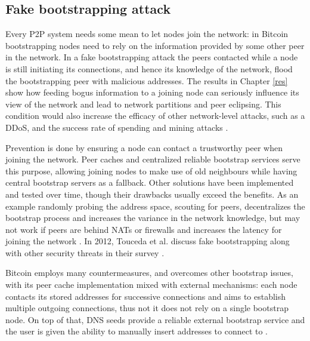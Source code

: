 \documentclass[12pt, letterpaper, twoside]{article}
\begin{document}
\subsection{Fake bootstrapping attack}\label{fakeboot}
Every P2P system needs some mean to let nodes join the network: in Bitcoin bootstrapping nodes need to rely on the information provided by some other peer in the network. In a fake bootstrapping attack the peers contacted while a node is still initiating its connections, and hence its knowledge of the network, flood the bootstrapping peer with malicious addresses. The results in Chapter \ref{res} show how feeding bogus information to a joining node can seriously influence its view of the network and lead to network partitions and peer eclipsing. This condition would also increase the efficacy of other network-level attacks, such as a DDoS, and the success rate of spending and mining attacks \cite{eclipseatk}.

Prevention is done by ensuring a node can contact a trustworthy peer when joining the network. Peer caches and centralized reliable bootstrap services serve this purpose, allowing joining nodes to make use of old neighbours while having central bootstrap servers as a fallback. Other solutions have been implemented and tested over time, though their drawbacks usually exceed the benefits. As an example randomly probing the address space, scouting for peers, decentralizes the bootstrap process and increases the variance in the network knowledge, but may not work if peers are behind NATs or firewalls and increases the latency for joining the network \cite{decentrbootstrapp2p} \cite{localityaware}. In 2012,  Touceda et al. discuss fake bootstrapping along with other security threats in their survey \cite{toucedafakeboot}.

Bitcoin employs many countermeasures, and overcomes other bootstrap issues, with its peer cache implementation mixed with external mechanisms: each node contacts its stored addresses for successive connections and aims to establish multiple outgoing connections, thus not it does not rely on a single bootstrap node. On top of that, DNS seeds provide a reliable external bootstrap service and the user is given the ability to manually insert addresses to connect to \cite{mahmoud_netsec_boot}.
\end{document}
